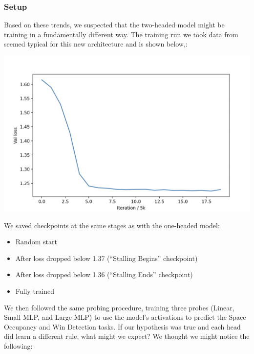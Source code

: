\documentclass[11pt]{article}
\providecommand{\tightlist}{%
      \setlength{\itemsep}{0pt}\setlength{\parskip}{0pt}}
\begin{document}
    \subsubsection{Setup}\label{setup}

Based on these trends, we suspected that the two-headed model might be
training in a fundamentally different way. The training run we took data
from seemed typical for this new architecture and is shown below,:

\begin{center}
\includegraphics[keepaspectratio]{inserted_images/probing_trial_2h.png}
\end{center}

We saved checkpoints at the same stages as with the one-headed model:

\begin{itemize}
\tightlist
\item
  Random start
\item
  After loss dropped below 1.37 (``Stalling Begins'' checkpoint)
\item
  After loss dropped below 1.36 (``Stalling Ends'' checkpoint)
\item
  Fully trained
\end{itemize}

We then followed the same probing procedure, training three probes
(Linear, Small MLP, and Large MLP) to use the model's activations to
predict the Space Occupancy and Win Detection tasks. If our hypothesis
was true and each head did learn a different rule, what might we expect?
We thought we might notice the following:
\end{document}
